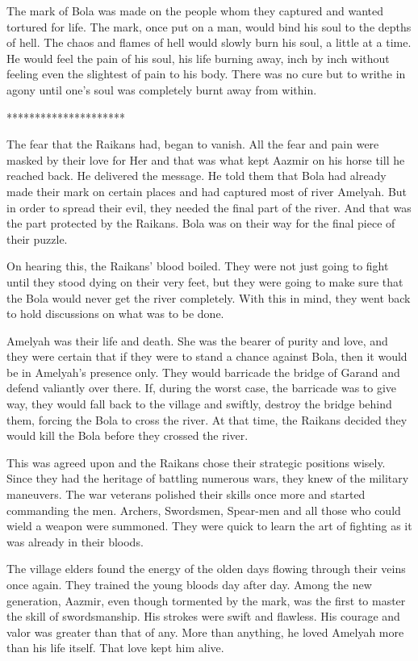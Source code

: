 \documentclass[twoside,11pt,titlepage]{article}
\begin{document}
The mark of Bola was made on the people whom they captured and wanted tortured for life. The mark, once put on a man, would bind his soul to the depths of hell. The chaos and flames of hell would slowly burn his soul, a little at a time. He would feel the pain of his soul, his life burning away, inch by inch without feeling even the slightest of pain to his body. There was no cure but to writhe in agony until one's soul was completely burnt away from within.

\bigskip
\begin{center}
*********************
\end{center}

The fear that the Raikans had, began to vanish. All the fear and pain were masked by their love for Her and that was what kept Aazmir on his horse till he reached back. He delivered the message. He told them that Bola had already made their mark on certain places and had captured most of river Amelyah. But in order to spread their evil, they needed the final part of the river. And that was the part protected by the Raikans. Bola was on their way for the final piece of their puzzle.

On hearing this, the Raikans' blood boiled. They were not just going to fight until they stood dying on their very feet, but they were going to make sure that the Bola would never get the river completely. With this in mind, they went back to hold discussions on what was to be done.

Amelyah was their life and death. She was the bearer of purity and love, and they were certain that if they were to stand a chance against Bola, then it would be in Amelyah's presence only. They would barricade the bridge of Garand and defend valiantly over there. If, during the worst case, the barricade was to give way, they would fall back to the village and swiftly, destroy the bridge behind them, forcing the Bola to cross the river. At that time, the Raikans decided they would kill the Bola before they crossed the river.

This was agreed upon and the Raikans chose their strategic positions wisely. Since they had the heritage of battling numerous wars, they knew of the military maneuvers. The war veterans polished their skills once more and started commanding the men. Archers, Swordsmen, Spear-men and all those who could wield a weapon were summoned. They were quick to learn the art of fighting as it was already in their bloods.

The village elders found the energy of the olden days flowing through their veins once again. They trained the young bloods day after day. Among the new generation, Aazmir, even though tormented by the mark, was the first to master the skill of swordsmanship. His strokes were swift and flawless. His courage and valor was greater than that of any. More than anything, he loved Amelyah more than his life itself. That love kept him alive.
\end{document}
